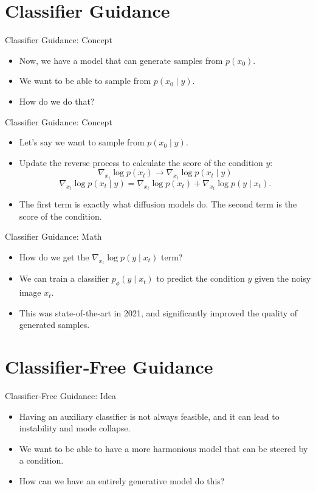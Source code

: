 \documentclass[11pt]{beamer}
\begin{document}
\section{Classifier Guidance}
\begin{frame}{Classifier Guidance: Concept}
  \begin{itemize}
    \item Now, we have a model that can generate samples from $p(x_0)$.
    \item We want to be able to sample from $p(x_0\mid y)$.
    \item How do we do that?
  \end{itemize}
\end{frame}

\begin{frame}{Classifier Guidance: Concept}
  \begin{itemize}
    \item Let's say we want to sample from $p(x_0\mid y)$.
    \item Update the reverse process to calculate the score of the condition $y$:
      \[
        \nabla_{x_t}\log p(x_t)
        \rightarrow \nabla_{x_t}\log p(x_t\mid y)
      \]
      \[
        \nabla_{x_t}\log p(x_t\mid y)
        = \nabla_{x_t}\log p(x_t)
        + \nabla_{x_t}\log p(y\mid x_t).
      \]
    \item The first term is exactly what diffusion models do. The second term is the score of the condition.
  \end{itemize}
\end{frame}

\begin{frame}{Classifier Guidance: Math}
  \begin{itemize}
    \item How do we get the $\nabla_{x_t}\log p(y\mid x_t)$ term?
    \item We can train a classifier $p_\phi(y\mid x_t)$ to predict the condition $y$ given the noisy image $x_t$.
    \item This was state-of-the-art in 2021, and significantly improved the quality of generated samples.
  \end{itemize}
\end{frame}

\section{Classifier‐Free Guidance}
\begin{frame}{Classifier-Free Guidance: Idea}
  \begin{itemize}
    \item Having an auxiliary classifier is not always feasible, and it can lead to instability and mode collapse.
    \item We want to be able to have a more harmonious model that can be steered by a condition.
    \item How can we have an entirely generative model do this?
  \end{itemize}
\end{frame}
\end{document}
